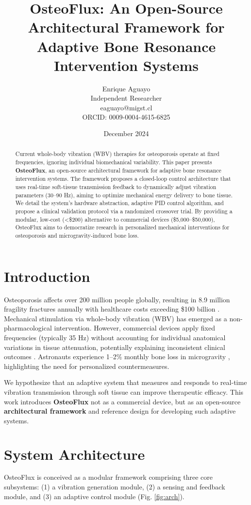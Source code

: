\documentclass[twocolumn]{article}
\title{OsteoFlux: An Open-Source Architectural Framework for Adaptive Bone Resonance Intervention Systems}
\author{Enrique Aguayo \\ Independent Researcher \\ eaguayo@migst.cl \\ ORCID: 0009-0004-4615-6825}
\date{December 2024}
\begin{document}
\maketitle

\begin{abstract}
Current whole-body vibration (WBV) therapies for osteoporosis operate at fixed frequencies, ignoring individual biomechanical variability. This paper presents \textbf{OsteoFlux}, an open-source architectural framework for adaptive bone resonance intervention systems. The framework proposes a closed-loop control architecture that uses real-time soft-tissue transmission feedback to dynamically adjust vibration parameters (30–90 Hz), aiming to optimize mechanical energy delivery to bone tissue. We detail the system's hardware abstraction, adaptive PID control algorithm, and propose a clinical validation protocol via a randomized crossover trial. By providing a modular, low-cost (<\$200) alternative to commercial devices (\$5,000–\$50,000), OsteoFlux aims to democratize research in personalized mechanical interventions for osteoporosis and microgravity-induced bone loss.
\end{abstract}

\section{Introduction}
Osteoporosis affects over 200 million people globally, resulting in 8.9 million fragility fractures annually with healthcare costs exceeding \$100 billion \cite{kiel2015}. Mechanical stimulation via whole-body vibration (WBV) has emerged as a non-pharmacological intervention. However, commercial devices apply fixed frequencies (typically 35 Hz) without accounting for individual anatomical variations in tissue attenuation, potentially explaining inconsistent clinical outcomes \cite{saamanen2018}. Astronauts experience 1–2\% monthly bone loss in microgravity \cite{nasa2020}, highlighting the need for personalized countermeasures.

We hypothesize that an adaptive system that measures and responds to real-time vibration transmission through soft tissue can improve therapeutic efficacy. This work introduces \textbf{OsteoFlux} not as a commercial device, but as an open-source \textbf{architectural framework} and reference design for developing such adaptive systems.

\section{System Architecture}
OsteoFlux is conceived as a modular framework comprising three core subsystems: (1) a vibration generation module, (2) a sensing and feedback module, and (3) an adaptive control module (Fig. \ref{fig:arch}).
\end{document}
